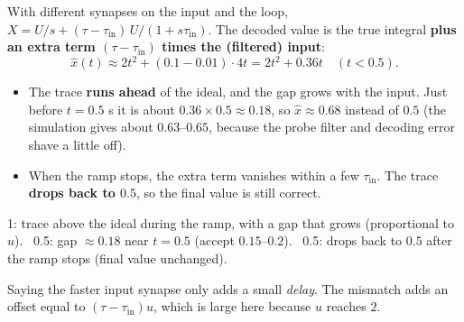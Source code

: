 \documentclass[11pt,letterpaper]{article}
\newcommand{\tin}{\tau_{\mathrm{in}}}
\newcommand{\ans}[1]{\par\vspace{4pt}{\bfseries #1}\quad}
\begin{document}
\ans{(b) [2]}
With different synapses on the input and the loop, $X = U/s + (\tau - \tin)\,U/(1 + s\tin)$. The decoded value is the true integral \textbf{plus an extra term $(\tau - \tin)$ times the (filtered) input}:
\[
\hat x(t) \approx 2t^2 + (0.1 - 0.01)\cdot 4t = 2t^2 + 0.36t \quad (t < 0.5).
\]
\begin{itemize}[leftmargin=1.2em]
\item The trace \textbf{runs ahead} of the ideal, and the gap grows with the input. Just before $t = 0.5$ s it is about $0.36 \times 0.5 \approx \mathbf{0.18}$, so $\hat x \approx 0.68$ instead of $0.5$ (the simulation gives about $0.63$--$0.65$, because the probe filter and decoding error shave a little off).
\item When the ramp stops, the extra term vanishes within a few $\tin$. The trace \textbf{drops back to $0.5$}, so the final value is still correct.
\end{itemize}
\begin{center}
\end{center}
\begin{marking}
1: trace above the ideal during the ramp, with a gap that grows (proportional to $u$). \ 0.5: gap $\approx 0.18$ near $t = 0.5$ (accept $0.15$--$0.2$). \ 0.5: drops back to $0.5$ after the ramp stops (final value unchanged).
\end{marking}
\begin{trap}
Saying the faster input synapse only adds a small \emph{delay}. The mismatch adds an offset equal to $(\tau - \tin)u$, which is large here because $u$ reaches $2$.
\end{trap}
\end{document}
